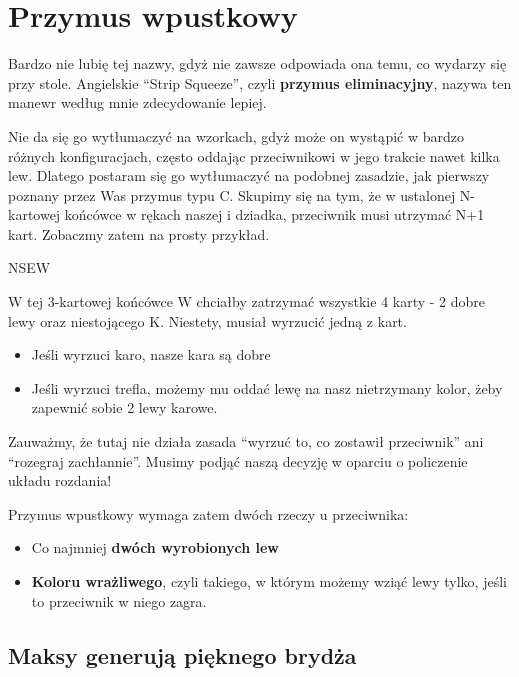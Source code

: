 \documentclass[12pt, a4paper]{article}
\newcounter{board}
\newcommand\nextboard{\stepcounter{board}\theboard}
\begin{document}
\pagebreak
\section*{Przymus wpustkowy}

Bardzo nie lubię tej nazwy, gdyż nie zawsze odpowiada ona temu, co wydarzy się przy stole. Angielskie ``Strip Squeeze'', czyli \textbf{przymus eliminacyjny}, nazywa ten manewr według mnie zdecydowanie lepiej.

Nie da się go wytłumaczyć na wzorkach, gdyż może on wystąpić w bardzo różnych konfiguracjach, często oddając przeciwnikowi w jego trakcie nawet kilka lew.
Dlatego postaram się go wytłumaczyć na podobnej zasadzie, jak pierwszy poznany przez Was przymus typu C. Skupimy się na tym, że w ustalonej N-kartowej końcówce w rękach naszej i dziadka,
przeciwnik musi utrzymać N+1 kart. Zobaczmy zatem na prosty przykład.

\handdiagramv[\nextboard]{\vhand{}{}{xx}{x}}
				{\vhand{}{}{}{}}
				{}
				{}{NSEW}
				
W tej 3-kartowej końcówce W chciałby zatrzymać wszystkie 4 karty - 2 dobre lewy oraz niestojącego \xdiams K. Niestety, musiał wyrzucić jedną z kart.

\begin{itemize}
	\item Jeśli wyrzuci karo, nasze kara są dobre
	\item Jeśli wyrzuci trefla, możemy mu oddać lewę na nasz nietrzymany kolor, żeby zapewnić sobie 2 lewy karowe.
\end{itemize}

Zauważmy, że tutaj nie działa zasada ``wyrzuć to, co zostawił przeciwnik'' ani ``rozegraj zachłannie''. Musimy podjąć naszą decyzję w oparciu o policzenie układu rozdania!

Przymus wpustkowy wymaga zatem dwóch rzeczy u przeciwnika:
\begin{itemize}
	\item Co najmniej \textbf{dwóch wyrobionych lew}
	\item \textbf{Koloru wrażliwego}, czyli takiego, w którym możemy wziąć lewy tylko, jeśli to przeciwnik w niego zagra.
\end{itemize}


\pagebreak
\subsection*{Maksy generują pięknego brydża}
\end{document}
